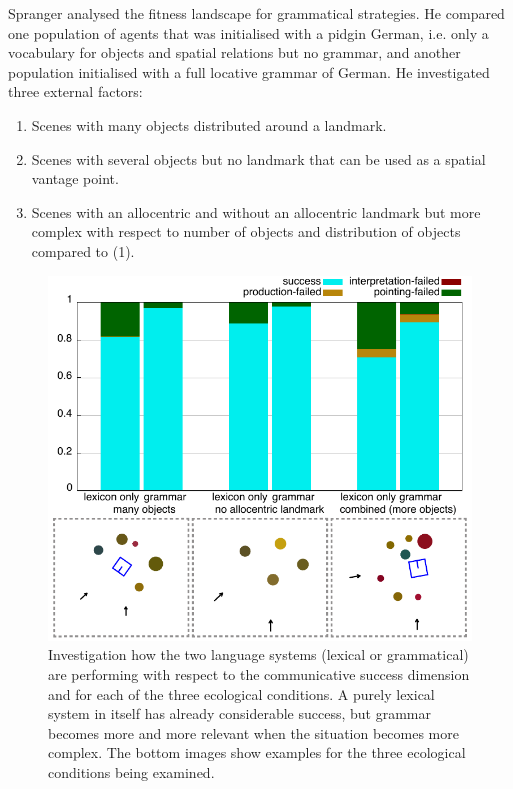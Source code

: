 Spranger analysed the fitness landscape for grammatical strategies. He compared 
one population of agents that was initialised with a pidgin German, i.e. only a vocabulary for objects and spatial relations 
but no grammar, and another population initialised with a full locative grammar of German. He investigated three external 
factors: 
\begin{enumerate}
\item Scenes with many objects distributed around a landmark.
\item Scenes with several objects but no landmark that can be used as a spatial vantage point. 
\item Scenes with an allocentric and without an allocentric landmark but more complex with respect to number 
of objects and distribution of objects compared to (1). 
\end{enumerate}

\begin{figure}
\centerline{\includegraphics[width=0.5\linewidth]{chap12/figs/why-grammar-german.pdf}}
\caption{Investigation how the two language systems (lexical or grammatical) are performing with respect to the 
communicative success dimension and for each of the three ecological conditions. A purely lexical system in itself has 
already considerable success, but grammar becomes more and more relevant when the situation becomes more complex.
The bottom images show examples for the three ecological conditions being examined.}
\label{fig:why-grammar-german}
\end{figure}

